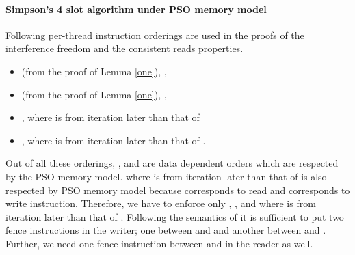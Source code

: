 \paragraph{\textbf{Simpson's 4 slot algorithm under PSO memory model}}
Following per-thread instruction orderings are used in the proofs of the interference freedom and the consistent reads properties.
\begin{itemize}
 \item (from the proof of Lemma \ref{one}), , 
 \item (from the proof of Lemma \ref{one}), , 
 \item , where  is from iteration later than that of 
 \item , where  is from iteration later than that of .
\end{itemize}
Out of all these orderings, ,  and  are data dependent orders which are respected by the PSO memory model. 
 where  is from iteration later than that of  is also respected by PSO memory model because  corresponds to read and  
corresponds to write instruction. Therefore, we have to enforce only , ,  and  where  is 
from iteration later than that of . Following the semantics of  it is sufficient to put two fence instructions in the writer; one between  and  
and another between  and . Further, we need one fence instruction between  and  in the reader as well. 
